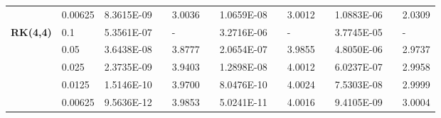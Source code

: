 \begin{table}[H]
\begin{tabular}{lllllrlrlrlrlrl}
\multicolumn{2}{l}{} & \multicolumn{2}{l}{0.00625} & 8.3615E-09 &       & 3.0036  &       & 1.0659E-08 &       & 3.0012  &       & 1.0883E-06 &       & 2.0309  \\
\multicolumn{2}{l}{\multirow{5}[1]{*}{\textbf{RK(4,4)}}} & \multicolumn{2}{l}{0.1} & 5.3561E-07 &       & -     &       & 3.2716E-06 &       & -     &       & 3.7745E-05 &       & - \\
\multicolumn{2}{l}{} & \multicolumn{2}{l}{0.05} & 3.6438E-08 &       & 3.8777  &       & 2.0654E-07 &       & 3.9855  &       & 4.8050E-06 &       & 2.9737  \\
\multicolumn{2}{l}{} & \multicolumn{2}{l}{0.025} & 2.3735E-09 &       & 3.9403  &       & 1.2898E-08 &       & 4.0012  &       & 6.0237E-07 &       & 2.9958  \\
\multicolumn{2}{l}{} & \multicolumn{2}{l}{0.0125} & 1.5146E-10 &       & 3.9700  &       & 8.0476E-10 &       & 4.0024  &       & 7.5303E-08 &       & 2.9999  \\
\multicolumn{2}{l}{} & \multicolumn{2}{l}{0.00625} & 9.5636E-12 &       & 3.9853  &       & 5.0241E-11 &       & 4.0016  &       & 9.4105E-09 &       & 3.0004  \\
\bottomrule
\end{tabular}%
\label{tab:6-3}%
\end{table}%
\vspace{-10mm}

